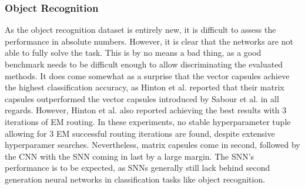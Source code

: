 \subsubsection{Object Recognition}
As the object recognition dataset is entirely new, it is difficult to assess the performance in absolute numbers. However, it is clear that the networks are not able to fully solve the task. This is by no means a bad thing, as a good benchmark needs to be difficult enough to allow discriminating the evaluated methods. It does come somewhat as a surprise that the vector capsules achieve the highest classification accuracy, as Hinton et al. reported that their matrix capsules outperformed the vector capsules introduced by Sabour et al. in all regards. However, Hinton et al. also reported achieving the best results with 3 iterations of EM routing. In these experiments, no stable hyperparameter tuple allowing for 3 EM successful routing iterations are found, despite extensive hyperparamer searches. Nevertheless, matrix capsules come in second, followed by the CNN with the SNN coming in last by a large margin. The SNN’s performance is to be expected, as SNNs generally still lack behind second generation neural networks in classification tasks like object recognition.

